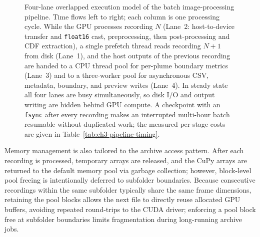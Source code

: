 \begin{figure}[!ht]
{%
}
\caption{Four-lane overlapped execution model of the batch image-processing pipeline. Time flows left to right; each column is one processing cycle. While the GPU processes recording $N$ (Lane~2: host-to-device transfer and \texttt{float16} cast, preprocessing, then post-processing and CDF extraction), a single prefetch thread reads recording $N{+}1$ from disk (Lane~1), and the host outputs of the previous recording are handed to a CPU thread pool for per-plume boundary metrics (Lane~3) and to a three-worker pool for asynchronous CSV, metadata, boundary, and preview writes (Lane~4). In steady state all four lanes are busy simultaneously, so disk I/O and output writing are hidden behind GPU compute. A checkpoint with an \texttt{fsync} after every recording makes an interrupted multi-hour batch resumable without duplicated work; the measured per-stage costs are given in Table~\ref{tab:ch3-pipeline-timing}.}
\label{fig:ch3-pipeline-lanes}
\end{figure}

Memory management is also tailored to the archive access pattern.
After each recording is processed, temporary arrays are released, and the CuPy arrays are returned to the default memory pool via garbage collection; however, block-level pool freeing is intentionally deferred to subfolder boundaries.
Because consecutive recordings within the same subfolder typically share the same frame dimensions, retaining the pool blocks allows the next file to directly reuse allocated GPU buffers, avoiding repeated round-trips to the CUDA driver; enforcing a pool block free at subfolder boundaries limits fragmentation during long-running archive jobs.

